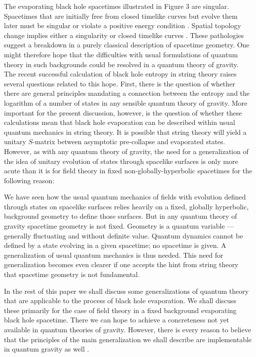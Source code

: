 The evaporating black hole spacetimes illustrated in Figure 3 are
singular. Spacetimes that are initially free from closed timelike curves
but evolve them later must be singular or
violate a positive energy condition
\cite{Tip77}. Spatial topology change implies either a singularity or
closed timelike curves \cite{Ger67}. These
pathologies suggest a breakdown in a purely classical description of
spacetime geometry.
One might therefore hope that the difficulties with usual 
formulations of quantum
theory in such backgrounds could be resolved in a quantum theory of
gravity.  The recent successful calculation of black hole entropy in
string theory \cite{SBHsum} raises several questions related to this
hope.  First, there is
the question of whether there are general principles mandating
a connection
between the entropy and the logarithm of a number of states in any
sensible quantum theory of gravity.  More important for the present
discussion, however, is the question of
whether these calculations mean that black
hole evaporation can be described within usual quantum mechanics in
string theory. It is possible that string theory will yield a unitary
$S$-matrix between asymptotic pre-collapse and evaporated states.
However, as with any quantum theory of gravity, the need for a
generalization of the idea of unitary evolution of states through
spacelike surfaces is only more acute than it is for field theory
in fixed non-globally-hyperbolic spacetimes for the following reason:

We have seen how the usual
quantum mechanics of fields with evolution defined through states on
spacelike surfaces relies heavily on a fixed, globally hyperbolic,
 background geometry 
to define those surfaces. But in any quantum
theory of gravity spacetime geometry is not fixed. Geometry is a quantum
variable --- generally fluctuating and without definite value. Quantum
dynamics cannot be defined by a state evolving in a given spacetime; no
spacetime is given.  A generalization of usual quantum mechanics is thus
needed. This need for generalization becomes even clearer if one accepts
the hint from string theory that spacetime geometry is not fundamental.

In the rest of this paper we shall discuss some generalizations of
quantum theory that are applicable to the process of black hole
evaporation.  We shall discuss these primarily for the case of field
theory in a fixed background evaporating black hole spacetime.  
There we
can hope to achieve a concreteness not yet available in quantum theories
of gravity.  However, there is every reason to believe 
that the principles of the
main generalization we shall describe are implementable in quantum
gravity as well \cite{Har95c}.

